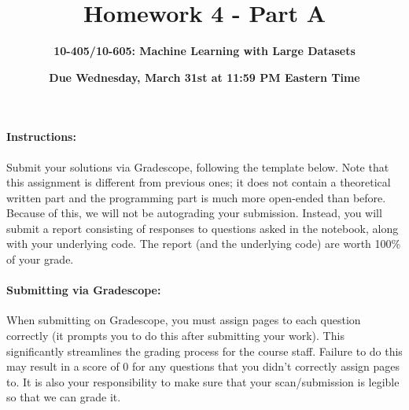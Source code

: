 \documentclass{exam}
\begin{document}
\title{Homework 4 - Part A}
\author{\Large \bf 10-405/10-605: Machine Learning with Large Datasets}
\date{{\bf Due Wednesday, March 31st at 11:59 PM Eastern Time}}
\maketitle

\paragraph{Instructions:} Submit your solutions via Gradescope, following the template below.  Note that this assignment is different from previous ones; it does not contain a theoretical written part and the programming part is much more open-ended than before. Because of this, we will not be autograding your submission. Instead, you will submit a report consisting of responses to questions asked in the notebook, along with your underlying code. The report (and the underlying code) are worth 100\% of your grade.

\paragraph{Submitting via Gradescope:} When submitting on Gradescope, you must assign pages to each question correctly (it
prompts you to do this after submitting your work). This significantly streamlines the
grading process for the course staff.  Failure to do this may result in a score of 0 for any questions
that you didn't correctly assign pages to. It is also your responsibility to make sure that your scan/submission is legible so that we can grade it.


\clearpage


\clearpage

\end{document}

